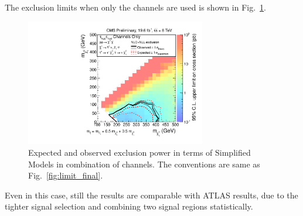 The exclusion limits when only the \tauTau channels are used is shown in Fig.~\ref{fig:limit_tauTau}.
\begin{linenomath}
\begin{figure}[!htb]
\centering
\includegraphics[width=0.7\textwidth,keepaspectratio=true]{StatisticsFig/ExclusionTauTau2Bin.pdf}
\caption{Expected and observed exclusion power in terms of Simplified Models
in combination of \tauTau channels. The conventions are same as Fig.~\ref{fig:limit_final}.}
\label{fig:limit_tauTau}
\end{figure}
\end{linenomath}
Even in this case, still the results are comparable with ATLAS results, 
due to the tighter signal selection and combining two signal regions statistically.


